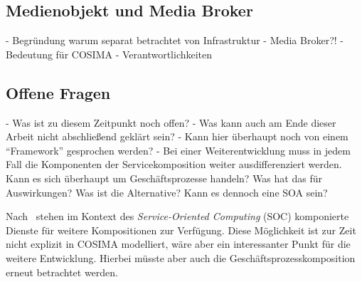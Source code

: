 
\subsection{Medienobjekt und Media Broker} %
\label{sub:medienobjekt}

  - Begründung warum separat betrachtet von Infrastruktur
  - Media Broker?!
  - Bedeutung für COSIMA
  - Verantwortlichkeiten


\subsection{Offene Fragen} %
\label{sub:offene_fragen}

  - Was ist zu diesem Zeitpunkt noch offen?
  - Was kann auch am Ende dieser Arbeit nicht abschließend geklärt sein?
  - Kann hier überhaupt noch von einem "`Framework"' gesprochen werden?
  - Bei einer Weiterentwicklung muss in jedem Fall die Komponenten der Servicekomposition weiter ausdifferenziert werden. Kann es sich überhaupt um Geschäftsprozesse handeln? Was hat das für Auswirkungen? Was ist die Alternative? Kann es dennoch eine SOA sein?
  
  Nach~\citep{service_oriented_computing} stehen im Kontext des \emph{Service-Oriented Computing} (SOC) komponierte Dienste für weitere Kompositionen zur Verfügung. Diese Möglichkeit ist zur Zeit nicht explizit in COSIMA modelliert, wäre aber ein interessanter Punkt für die weitere Entwicklung. Hierbei müsste aber auch die Geschäftsprozesskomposition erneut betrachtet werden.
  



